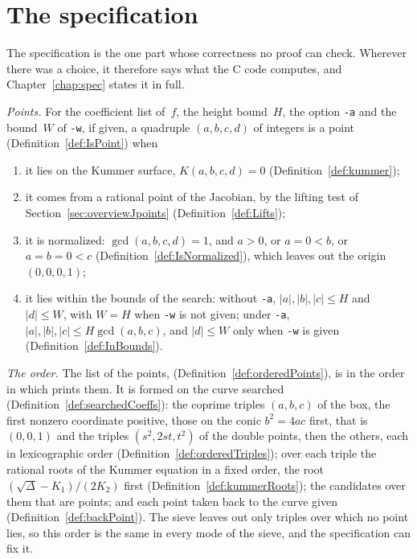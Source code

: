\section{The specification}\label{sec:overviewSpec}

The specification is the one part whose correctness no proof can check. Wherever there was a choice,
it therefore says what the C code computes, and Chapter~\ref{chap:spec} states it in full.

\emph{Points.} For the coefficient list of~$f$, the height bound~$H$, the option \verb|-a| and the
bound~$W$ of \verb|-w|, if given, a quadruple $(a, b, c, d)$ of integers is a point
(Definition~\ref{def:IsPoint}) when
\begin{enumerate}
  \item it lies on the Kummer surface, $K(a, b, c, d) = 0$ (Definition~\ref{def:kummer});
  \item it comes from a rational point of the Jacobian, by the lifting test of
    Section~\ref{sec:overviewJpoints} (Definition~\ref{def:Lifts});
  \item it is normalized: $\gcd(a, b, c, d) = 1$, and $a > 0$, or $a = 0 < b$, or $a = b = 0 < c$
    (Definition~\ref{def:IsNormalized}), which leaves out the origin $(0, 0, 0, 1)$;
  \item it lies within the bounds of the search: without \verb|-a|, $|a|, |b|, |c| \le H$ and $|d|
    \le W$, with $W = H$ when \verb|-w| is not given; under \verb|-a|, $|a|, |b|, |c| \le H \gcd(a,
    b, c)$, and $|d| \le W$ only when \verb|-w| is given (Definition~\ref{def:InBounds}).
\end{enumerate}

\emph{The order.} The list of the points, 
(Definition~\ref{def:orderedPoints}), is in the order in which \jpoints{} prints them. It is formed
on the curve searched (Definition~\ref{def:searchedCoeffs}): the coprime triples $(a, b, c)$ of the
box, the first nonzero coordinate positive, those on the conic $b^2 = 4ac$ first, that is $(0, 0,
1)$ and the triples $(s^2, 2st, t^2)$ of the double points, then the others, each in lexicographic
order (Definition~\ref{def:orderedTriples}); over each triple the rational roots of the Kummer
equation in a fixed order, the root $(\sqrt{\Delta} - K_1)/(2K_2)$ first
(Definition~\ref{def:kummerRoots}); the candidates over them that are points; and each point taken
back to the curve given (Definition~\ref{def:backPoint}). The sieve leaves out only triples over
which no point lies, so this order is the same in every mode of the sieve, and the specification can
fix it.

